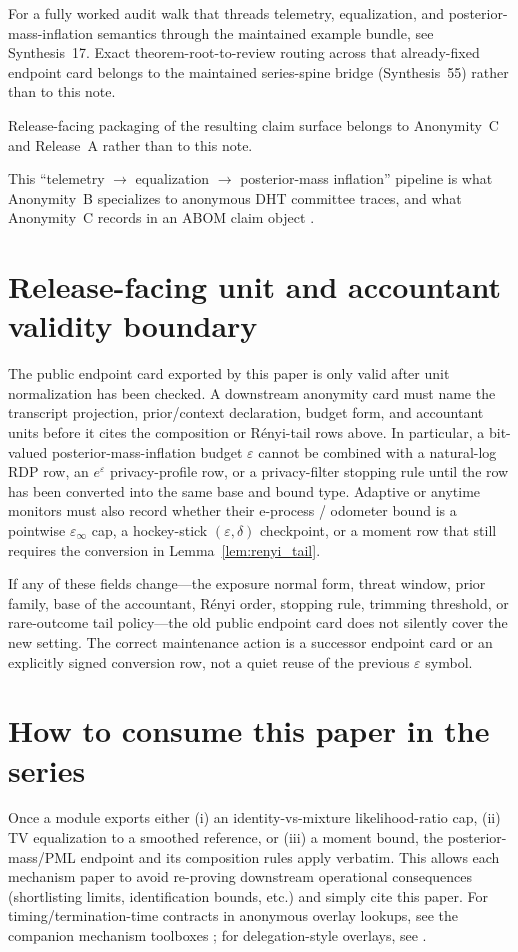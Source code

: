 \documentclass[11pt]{article}
\theoremstyle{definition}
\theoremstyle{remark}
\begin{document}
For a fully worked audit walk that threads telemetry, equalization, and posterior-mass-inflation semantics through the maintained example bundle, see Synthesis~17.\cite{series:workedexample} Exact theorem-root-to-review routing across that already-fixed endpoint card belongs to the maintained series-spine bridge (Synthesis~55) rather than to this note.\cite{series:seriesspines}

Release-facing packaging of the resulting claim surface belongs to Anonymity~C and Release~A rather than to this note.\cite{series:abomoinl,series:releaseA}

This ``telemetry $\rightarrow$ equalization $\rightarrow$ posterior-mass inflation'' pipeline is what Anonymity~B specializes to anonymous DHT committee traces, and what Anonymity~C records in an ABOM claim object \cite{series:profiling,series:abomoinl}.

\section{Release-facing unit and accountant validity boundary}\label{sec:unit_validity_boundary}
The public endpoint card exported by this paper is only valid after unit normalization has been checked.
A downstream anonymity card must name the transcript projection, prior/context declaration, budget form, and accountant units before it cites the composition or R\'enyi-tail rows above.
In particular, a bit-valued posterior-mass-inflation budget $\varepsilon$ cannot be combined with a natural-log RDP row, an $e^\varepsilon$ privacy-profile row, or a privacy-filter stopping rule until the row has been converted into the same base and bound type.
Adaptive or anytime monitors must also record whether their e-process / odometer bound is a pointwise $\varepsilon_\infty$ cap, a hockey-stick $(\varepsilon,\delta)$ checkpoint, or a moment row that still requires the conversion in Lemma~\ref{lem:renyi_tail}.

If any of these fields change---the exposure normal form, threat window, prior family, base of the accountant, R\'enyi order, stopping rule, trimming threshold, or rare-outcome tail policy---the old public endpoint card does not silently cover the new setting.
The correct maintenance action is a successor endpoint card or an explicitly signed conversion row, not a quiet reuse of the previous $\varepsilon$ symbol.

\section{How to consume this paper in the series}
Once a module exports either (i) an identity-vs-mixture likelihood-ratio cap, (ii) TV equalization to a smoothed reference, or (iii) a moment bound,
the posterior-mass/PML endpoint and its composition rules apply verbatim.
This allows each mechanism paper to avoid re-proving downstream operational consequences (shortlisting limits, identification bounds, etc.) and simply cite this paper.
For timing/termination-time contracts in anonymous overlay lookups, see the companion mechanism toolboxes \cite{series:schedcompiler,series:prefixcapacities}; for delegation-style overlays, see \cite{series:spectral}.
\end{document}
